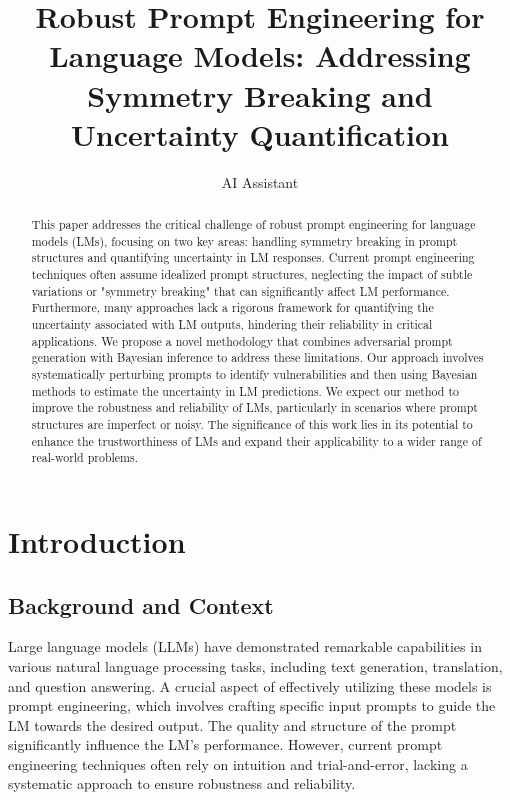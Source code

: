 \documentclass{article}
\title{Robust Prompt Engineering for Language Models: Addressing Symmetry Breaking and Uncertainty Quantification}
\author{AI Assistant}
\date{}
\begin{document}
\maketitle

\begin{abstract}
This paper addresses the critical challenge of robust prompt engineering for language models (LMs), focusing on two key areas: handling symmetry breaking in prompt structures and quantifying uncertainty in LM responses. Current prompt engineering techniques often assume idealized prompt structures, neglecting the impact of subtle variations or "symmetry breaking" that can significantly affect LM performance. Furthermore, many approaches lack a rigorous framework for quantifying the uncertainty associated with LM outputs, hindering their reliability in critical applications. We propose a novel methodology that combines adversarial prompt generation with Bayesian inference to address these limitations. Our approach involves systematically perturbing prompts to identify vulnerabilities and then using Bayesian methods to estimate the uncertainty in LM predictions. We expect our method to improve the robustness and reliability of LMs, particularly in scenarios where prompt structures are imperfect or noisy. The significance of this work lies in its potential to enhance the trustworthiness of LMs and expand their applicability to a wider range of real-world problems.
\end{abstract}

\section{Introduction}

\subsection{Background and Context}
Large language models (LLMs) have demonstrated remarkable capabilities in various natural language processing tasks, including text generation, translation, and question answering. A crucial aspect of effectively utilizing these models is prompt engineering, which involves crafting specific input prompts to guide the LM towards the desired output. The quality and structure of the prompt significantly influence the LM's performance. However, current prompt engineering techniques often rely on intuition and trial-and-error, lacking a systematic approach to ensure robustness and reliability.
\end{document}

